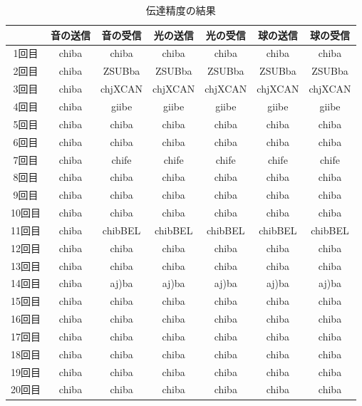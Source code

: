 \begin{table}
\caption{伝達精度の結果}

\begin{tabular}{|c|c|c|c|c|c|c|} 
\hline %
　 & 音の送信 & 音の受信& 光の送信 & 光の受信 & 球の送信 & 球の受信 \\
\hline %
1回目 & chiba & chiba & chiba & chiba & chiba & chiba \\
2回目 & chiba & ZSUBba & ZSUBba & ZSUBba & ZSUBba & ZSUBba \\
3回目 & chiba & chjXCAN & chjXCAN & chjXCAN & chjXCAN & chjXCAN \\
4回目 & chiba & giibe & giibe & giibe & giibe & giibe \\
5回目 & chiba & chiba & chiba & chiba & chiba & chiba \\
6回目 & chiba & chiba & chiba & chiba & chiba & chiba \\
7回目 & chiba & chife & chife & chife & chife & chife \\
8回目 & chiba & chiba & chiba & chiba & chiba & chiba \\
9回目 & chiba & chiba & chiba & chiba & chiba & chiba \\
10回目 & chiba & chiba & chiba & chiba & chiba & chiba \\
11回目 & chiba & chibBEL & chibBEL & chibBEL & chibBEL & chibBEL \\
12回目 & chiba & chiba & chiba & chiba & chiba & chiba \\
13回目 & chiba & chiba & chiba & chiba & chiba & chiba \\
14回目 & chiba & aj)ba & aj)ba & aj)ba & aj)ba & aj)ba \\
15回目 & chiba & chiba & chiba & chiba & chiba & chiba \\
16回目 & chiba & chiba & chiba & chiba & chiba & chiba \\
17回目 & chiba & chiba & chiba & chiba & chiba & chiba \\
18回目 & chiba & chiba & chiba & chiba & chiba & chiba \\
19回目 & chiba & chiba & chiba & chiba & chiba & chiba \\
20回目 & chiba & chiba & chiba & chiba & chiba & chiba \\

\hline %
\end{tabular}

\label{kekka_seido}
\end{table}

